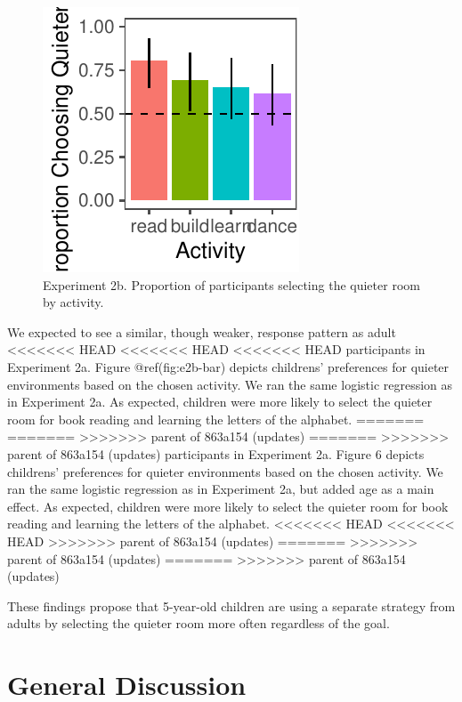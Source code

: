 \documentclass[10pt, letterpaper]{article}
\newenvironment{CodeChunk}{}{}
\begin{document}
\begin{CodeChunk}
\begin{figure}[H]

{\centering \includegraphics{figs/unnamed-chunk-4-1} 

}

\caption[Experiment 2b]{Experiment 2b. Proportion of participants selecting the quieter room by activity.}\label{fig:unnamed-chunk-4}
\end{figure}
\end{CodeChunk}

We expected to see a similar, though weaker, response pattern as adult
<<<<<<< HEAD
<<<<<<< HEAD
<<<<<<< HEAD
participants in Experiment 2a. Figure @ref(fig:e2b-bar) depicts
childrens' preferences for quieter environments based on the chosen
activity. We ran the same logistic regression as in Experiment 2a. As
expected, children were more likely to select the quieter room for book
reading and learning the letters of the alphabet.
=======
=======
>>>>>>> parent of 863a154 (updates)
=======
>>>>>>> parent of 863a154 (updates)
participants in Experiment 2a. Figure 6 depicts childrens' preferences
for quieter environments based on the chosen activity. We ran the same
logistic regression as in Experiment 2a, but added age as a main effect.
As expected, children were more likely to select the quieter room for
book reading and learning the letters of the alphabet.
<<<<<<< HEAD
<<<<<<< HEAD
>>>>>>> parent of 863a154 (updates)
=======
>>>>>>> parent of 863a154 (updates)
=======
>>>>>>> parent of 863a154 (updates)

These findings propose that 5-year-old children are using a separate
strategy from adults by selecting the quieter room more often regardless
of the goal.

\hypertarget{general-discussion}{%
\section{General Discussion}\label{general-discussion}}
\end{document}
